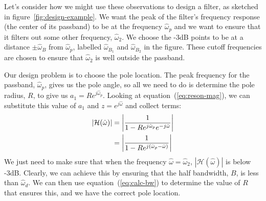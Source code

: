 Let's consider how we might use these observations to design a filter,
as sketched in figure~\ref{fig:design-example}. We want the peak of the
filter's frequency response (the center of its passband) to be at the
frequency $\hat{\omega}_p$ and we want to ensure that it filters out
some other frequency, $\hat{\omega}_2$. We choose the -3dB points to
be at a distance $\pm\hat{\omega}_B$ from $\hat{\omega}_p$, labelled
$\hat{\omega}_{B_1}$ and $\hat{\omega}_{B_2}$ in the figure. These
cutoff frequencies are chosen to ensure that $\hat{\omega}_2$ is well
outside the passband.

Our design problem is to choose the pole location. The peak frequency
for the passband, $\hat{\omega}_p$, gives us the pole angle, so all we
need to do is determine the pole radius, $R$, to give us
$a_1=Re^{j\hat{\omega}_p}$. Looking at equation~(\ref{eq:reson-mag}),
we can substitute this value of $a_1$ and $z=e^{j\hat{\omega}}$ and
collect terms:
\begin{align}
|\mathcal{H}(\hat{\omega})| &=
\left|\frac{1}{1-Re^{j\hat{\omega}_p}e^{-j\hat{\omega}}}\right| \notag\\
  &= \left|\frac{1}{1-Re^{j(\hat{\omega}_p - \hat{\omega})}}\right|
\end{align}
We just need to make sure that when the frequency $\hat{\omega} =
\hat{\omega}_2$, $|\mathcal{H}(\hat{\omega})|$ is below -3dB. Clearly,
we can achieve this by ensuring that the half bandwidth, $B$, is less
than $\hat{\omega}_d$. We can then use equation~(\ref{eq:calc-bw}) to
determine the value of $R$ that ensures this, and we have the correct
pole location.


